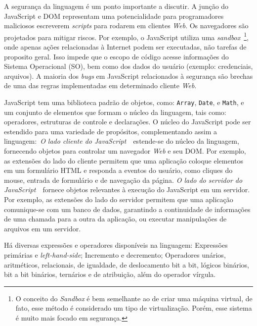 A segurança da linguagem é um ponto importante a discutir. A junção do JavaScript e DOM representam uma potencialidade para programadores maliciosos escreverem \textit{scripts} para rodarem em clientes \textit{Web}. Os navegadores são projetados para mitigar riscos. Por exemplo, o JavaScript utiliza uma \textit{sandbox}~\footnote{O conceito do \textit{Sandbox} é bem semelhante ao de criar uma máquina virtual, de fato, esse método é considerado um tipo de virtualização. Porém, esse sistema é muito mais focado em segurança.}, onde apenas ações relacionadas à Internet podem ser executadas, não tarefas de proposito geral. Isso impede que o escopo de código acesse informações do Sistema Operacional (SO), bem como dos dados do usuário (exemplo: credenciais, arquivos). A maioria dos \textit{bugs} em JavaScript relacionados à segurança são brechas de uma das regras implementadas em determinado cliente \textit{Web}.

JavaScript  tem uma biblioteca padrão de objetos, como: \texttt{Array}, \texttt{Date}, e \texttt{Math}, e um conjunto de elementos que formam o núcleo da linguagem, tais como: operadores, estruturas de controle e declarações. O núcleo do JavaScript pode ser estendido para uma variedade de propósitos, complementando assim a linguagem:~\textit{O lado cliente do JavaScript}~\textemdash~estende-se do núcleo da linguagem, fornecendo objetos para controlar um navegador \textit{Web} e seu DOM. Por exemplo, as extensões do lado do cliente permitem que uma aplicação coloque elementos em um formulário HTML e responda a eventos do usuário, como cliques do mouse, entrada de formulário e de navegação da página. \textit{O lado do servidor do JavaScript}~\textemdash~fornece objetos relevantes à execução do JavaScript em um servidor. Por exemplo, as extensões do lado do servidor permitem que uma aplicação comunique-se com um banco de dados, garantindo a continuidade de informações de uma chamada para a outra da aplicação, ou executar manipulações de arquivos em um servidor.

Há diversas expressões e operadores disponíveis na linguagem: Expressões primárias e \textit{left-hand-side}; Incremento e decremento; Operadores unários, aritméticos, relacionais, de igualdade, de deslocamento bit a bit, lógicos binários, bit a bit binários, ternários e de atribuição, além do operador vírgula.

